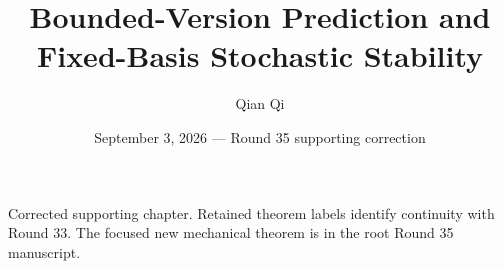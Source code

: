 \documentclass[10pt,reqno]{amsart}
\title{Bounded-Version Prediction and Fixed-Basis Stochastic Stability}
\author{Qian Qi}
\date{September 3, 2026 --- Round 35 supporting correction}
\begin{document}
\maketitle
\noindent Corrected supporting chapter. Retained theorem labels identify continuity with Round 33. The focused new mechanical theorem is in the root Round 35 manuscript.

\end{document}
